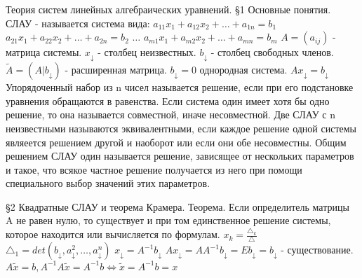 \documentclass[12pt]{article}
\begin{document}
    Теория систем линейных алгебраических уравнений.
    \S1 Основные понятия. \newline
    СЛАУ - называется система вида: \newline
    $a_{11} x_1 + a_{12} x_2 + \dots + a_{1n} = b_1$ \newline
    $a_{21} x_1 + a_{22} x_2 + \dots + a_{2n} = b_2$ \newline
    $\dots$ \newline
    $a_{m1} x_1 + a_{m2} x_2 + \dots + a_{mn} = b_m$ \newline
    $A = (a_{ij})$ -  матрица системы. \newline
    $x_{\downarrow}$ - столбец неизвестных. \newline
    $b_{\downarrow}$ - столбец свободных членов. \newline
    $\tilde A = (A|b_{\downarrow})$ - расширенная матрица. \newline
    $b_{\downarrow} = 0$ однородная система. \newline
    $Ax_\downarrow = b_\downarrow$ \newline
    Упорядоченный набор из n чисел называется решение, если при его подстановке уравнения обращаются в равенства. \newline
    Если система один имеет хотя бы одно решение, то она называется совместной, иначе несовместной. \newline
    Две СЛАУ с n неизвестными называются эквивалентными, если каждое решение одной системы являеется решением другой и наоборот или если они обе несовместны. \newline
    Общим решением СЛАУ один называется решение, зависящее от нескольких параметров и такое, что всякое частное решение получается из него при помощи специального выбор значений этих параметров.

    \S2 Квадратные СЛАУ и теорема Крамера. \newline
    Теорема. Если определитель матрицы A не равен нулю, то существует и при том единственное решение системы, которое находится или вычисляется по формулам. $x_k = \frac{\triangle_k}{\triangle}$ \newline
    $\triangle_1 = det(b_\downarrow, a_{\downarrow}^2,\dots, a_{\downarrow}^n)$ \newline
    $x_\downarrow = A^{-1} b_\downarrow$ \newline
    $Ax_\downarrow = AA^{-1} b_\downarrow = Eb_\downarrow = b_\downarrow$ - существование. \newline
    $A\tilde x = b, A^{-1}A\tilde x = A^{-1}b \Leftrightarrow \tilde x = A^{-1} b = x$ \newline
\end{document}
